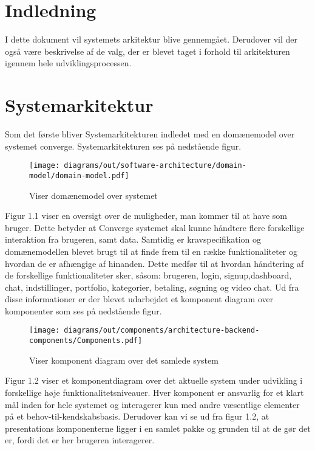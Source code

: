 
\chapter{Indledning}

I dette dokument vil systemets arkitektur blive gennemgået. 
Derudover vil der også være beskrivelse af de valg, der er blevet taget i forhold til arkitekturen igennem hele udviklingsprocessen. 
    
\chapter{Systemarkitektur}

Som det første bliver Systemarkitekturen indledet med en domænemodel over systemet converge. Systemarkitekturen ses på nedstående figur.

\begin{figure}[H]
    \centering
\texttt{[image: diagrams/out/software-architecture/domain-model/domain-model.pdf]}
\caption{Viser domænemodel over systemet}
\label{fig:figure4}
\end{figure}

Figur 1.1 viser en oversigt over de muligheder, man kommer til at have som bruger. Dette betyder at Converge systemet skal kunne håndtere flere forskellige interaktion fra brugeren, samt data. 
Samtidig er kravspecifikation og domænemodellen blevet brugt til at finde frem til en række funktionaliteter og hvordan de er afhængige af hinanden. Dette medfør til at hvordan håndtering af de forskellige funktionaliteter sker, såsom: brugeren, login, signup,dashboard, chat, indstillinger, portfolio, kategorier, betaling, søgning og video chat. Ud fra disse informationer er der blevet udarbejdet et komponent diagram over komponenter som ses på nedstående figur.

\begin{figure}[H]
    \centering
\texttt{[image: diagrams/out/components/architecture-backend-components/Components.pdf]}
\caption{Viser komponent diagram over det samlede system}
\label{fig:figure2}
\end{figure}

Figur 1.2 viser et komponentdiagram over det aktuelle system under udvikling i forskellige høje funktionalitetsniveauer. Hver komponent er ansvarlig for et klart mål inden for hele systemet og interagerer kun med andre væsentlige elementer på et behov-til-kendskabsbasis. Derudover kan vi se ud fra figur 1.2, at presentations komponenterne ligger i en samlet pakke og grunden til at de gør det er, fordi det er her brugeren interagerer.

